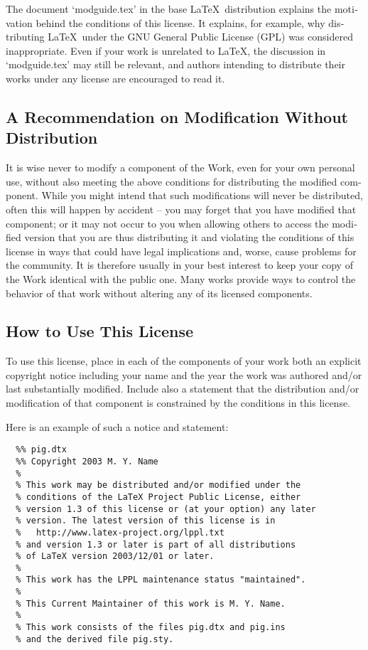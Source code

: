 \begin{otherlanguage}{english}
The document `modguide.tex' in the base \LaTeX\ distribution explains
the motivation behind the conditions of this license.  It explains, for
example, why distributing \LaTeX\ under the GNU General Public License
(GPL) was considered inappropriate.  Even if your work is unrelated to
\LaTeX, the discussion in `modguide.tex' may still be relevant, and
authors intending to distribute their works under any license are
encouraged to read it.

\subsection{A Recommendation on Modification Without Distribution}

It is wise never to modify a component of the Work, even for your own
personal use, without also meeting the above conditions for
distributing the modified component.  While you might intend that such
modifications will never be distributed, often this will happen by
accident -- you may forget that you have modified that component; or
it may not occur to you when allowing others to access the modified
version that you are thus distributing it and violating the conditions
of this license in ways that could have legal implications and, worse,
cause problems for the community.  It is therefore usually in your
best interest to keep your copy of the Work identical with the public
one.  Many works provide ways to control the behavior of that work
without altering any of its licensed components.

\subsection{How to Use This License}

To use this license, place in each of the components of your work both
an explicit copyright notice including your name and the year the work
was authored and/or last substantially modified.  Include also a
statement that the distribution and/or modification of that
component is constrained by the conditions in this license.

Here is an example of such a notice and statement:
\begin{verbatim}
  %% pig.dtx
  %% Copyright 2003 M. Y. Name
  %
  % This work may be distributed and/or modified under the
  % conditions of the LaTeX Project Public License, either
  % version 1.3 of this license or (at your option) any later
  % version. The latest version of this license is in
  %   http://www.latex-project.org/lppl.txt
  % and version 1.3 or later is part of all distributions
  % of LaTeX version 2003/12/01 or later.
  %
  % This work has the LPPL maintenance status "maintained".
  %
  % This Current Maintainer of this work is M. Y. Name.
  %
  % This work consists of the files pig.dtx and pig.ins
  % and the derived file pig.sty.
\end{verbatim}


\end{otherlanguage}
